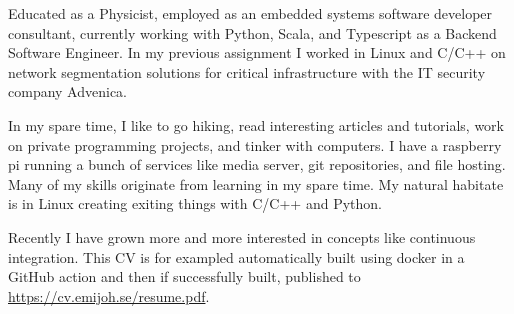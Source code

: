 

Educated as a Physicist, employed as an embedded systems software developer
consultant, currently working with Python, Scala, and Typescript as a Backend
Software Engineer. In my previous assignment I worked in Linux and C/C++ on
network segmentation solutions for critical infrastructure with the IT
security company Advenica.

In my spare time, I like to go hiking, read interesting articles and
tutorials, work on private programming projects, and tinker with computers. I
have a raspberry pi running a bunch of services like media server, git
repositories, and file hosting. Many of my skills originate from learning in
my spare time. My natural habitate is in Linux creating exiting things with
C/C++ and Python.

Recently I have grown more and more interested in concepts like continuous
integration. This CV is for exampled automatically built using docker in a
GitHub action and then if successfully built, published
to \url{https://cv.emijoh.se/resume.pdf}.

